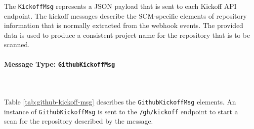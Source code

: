 The \texttt{KickoffMsg} represents a JSON payload that is sent to each Kickoff API endpoint.  The
kickoff messages describe the SCM-specific elements of repository information that is normally
extracted from the webhook events.  The provided data is used to produce a consistent \cxone
project name for the repository that is to be scanned.

\FloatBarrier
\pagebreak

\paragraph{Message Type: \texttt{GithubKickoffMsg}}

\noindent\\\\Table \ref{tab:github-kickoff-msg} describes the \texttt{GithubKickoffMsg} elements.  An instance
of \texttt{GithubKickoffMsg} is sent to the \texttt{/gh/kickoff} endpoint to start a scan for
the repository described by the message.

